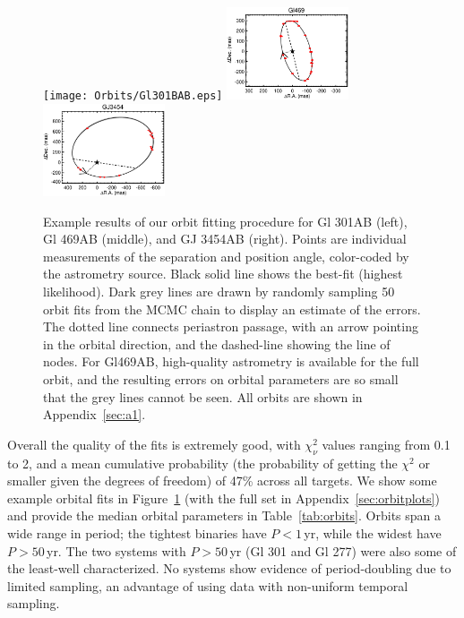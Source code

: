 \documentclass[twocolumn]{aastex62}
\begin{document}
\begin{figure}[htb]
\begin{center}
\texttt{[image: Orbits/Gl301BAB.eps]}
\includegraphics[width=0.32\textwidth]{Orbits/Gl469AB.eps}
\includegraphics[width=0.32\textwidth]{Orbits/GJ3454AB.eps}
\caption{Example results of our orbit fitting procedure for Gl 301AB (left), Gl 469AB (middle), and GJ 3454AB (right). Points are individual measurements of the separation and position angle, color-coded by the astrometry source. Black solid line shows the best-fit (highest likelihood). Dark grey lines are drawn by randomly sampling 50 orbit fits from the MCMC chain to display an estimate of the errors. The dotted line connects periastron passage, with an arrow pointing in the orbital direction, and the dashed-line showing the line of nodes. For Gl469AB, high-quality astrometry is available for the full orbit, and the resulting errors on orbital parameters are so small that the grey lines cannot be seen. All orbits are shown in Appendix~\ref{sec:a1}.}
\label{fig:orbits}
\end{center}
\end{figure}

Overall the quality of the fits is extremely good, with $\chi^2_\nu$ values ranging from 0.1 to 2, and a mean cumulative probability (the probability of getting the $\chi^2$ or smaller given the degrees of freedom) of 47\% across all targets. We show some example orbital fits in Figure~\ref{fig:orbits} (with the full set in Appendix~\ref{sec:orbitplots}) and provide the median orbital parameters in Table~\ref{tab:orbits}. Orbits span a wide range in period; the tightest binaries have $P<1$\,yr, while the widest have $P>50$\,yr. The two systems with $P>50$\,yr (Gl 301 and Gl 277) were also some of the least-well characterized. No systems show evidence of period-doubling due to limited sampling, an advantage of using data with non-uniform temporal sampling.
\end{document}
